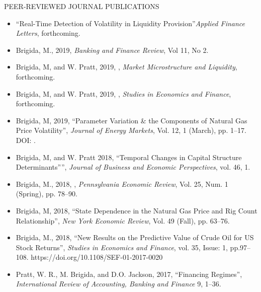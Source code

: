 \documentclass[9pt]{article}
\begin{document}
PEER-REVIEWED JOURNAL PUBLICATIONS
\begin{itemize}[noitemsep, nolistsep]
\item ``Real-Time Detection of Volatility in Liquidity Provision''{\it Applied Finance Letters}, forthcoming.
\item Brigida, M., 2019, \href{http://www.bankingandfinancereview.com/bfr/index.php/bfr/article/view/1074/180}{\color{Blue}{``The Effect of Bank Regulatory Capital Levels on Loan Types''}}{\it Banking and Finance Review}, Vol 11, No 2.
\item Brigida, M, and W. Pratt, 2019, \href{https://papers.ssrn.com/sol3/papers.cfm?abstract_id=3125788}{\color{Blue}{``Trade Intensity and Liquidity''}}, {\it Market Microstructure and Liquidity}, forthcoming.
\item Brigida, M, and W. Pratt, 2019, \href{https://papers.ssrn.com/sol3/papers.cfm?abstract_id=2848527}{\color{Blue}{High-Frequency Trading and the Weekly Natural Gas Storage Report}}, {\it Studies in Economics and Finance}, forthcoming.
\item Brigida, M, 2019, ``Parameter Variation \& the Components of Natural Gas Price Volatility'', {\it Journal of Energy Markets}, Vol. 12, 1 (March), pp. 1--17. DOI: \href{https://doi.org/10.21314/JEM.2018.182}{\color{Blue}{10.21314/JEM.2018.182}}.
\item Brigida, M, and W. Pratt 2018, ``Temporal Changes in Capital Structure Determinants”'', {\it Journal of Business and Economic Perspectives}, vol. 46, 1.
\item Brigida, M., 2018, \href{http://www.econpea.org/pub/PER2018Issue25no1.pdf}{\color{Blue}{``Causes of Asymmetric Volatility in Oil Futures''}}, {\it Pennsylvania Economic Review\/}, Vol. 25, Num. 1 (Spring), pp. 78--90.
\item Brigida, M, 2018, ``State Dependence in the Natural Gas Price and Rig Count Relationship'', {\it New York Economic Review}, Vol. 49 (Fall), pp. 63--76.
\item Brigida, M., 2018, ``New Results on the Predictive Value of Crude Oil for US Stock Returns'', {\it Studies in Economics and Finance}, vol. 35, Issue: 1, pp.97--108. https://doi.org/10.1108/SEF-01-2017-0020
\item Pratt, W. R., M. Brigida, and D.O. Jackson, 2017, ``Financing Regimes'', {\it International Review of Accounting, Banking and Finance} 9, 1--36. \href{http://www.irabf.org/publication/Financing Regimes.pdf}{\color{Blue}{http://www.irabf.org/publication/Financing Regimes.pdf}}

\end{itemize}
\end{document}
